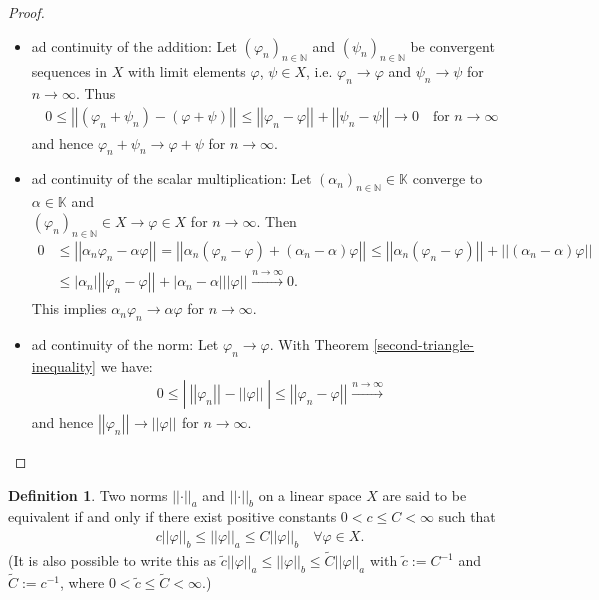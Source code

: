 \documentclass[12pt, a4paper]{article}
\numberwithin{equation}{section}
\theoremstyle{definition}
\theoremstyle{definition}
\newtheorem{defn}[thm]{Definition} %
\newcommand{\norm}[2]{\left\vert\left\vert #1 \right\vert\right\vert_{#2}}
\newcommand{\abs}[1]{\left\vert #1 \right\vert}
\begin{document}
	\begin{proof} 
		\begin{itemize}
			\item ad continuity of the addition: Let $(\varphi_n)_{n\in\mathbb{N}}$ and $(\psi_n)_{n\in\mathbb{N}}$ be convergent sequences in $X$ with limit elements $\varphi$, $\psi\in X$, i.e. $\varphi_n \longrightarrow \varphi$ and $\psi_n \longrightarrow \psi$ for $n\to\infty$. Thus 
			\begin{align}
				0\leq \norm{(\varphi_n + \psi_n) - (\varphi + \psi)}{} \leq \norm{\varphi_n - \varphi}{} + \norm{\psi_n - \psi}{} \longrightarrow 0 \quad\text{for } n\to \infty
			\end{align}
			and hence $\varphi_n + \psi_n \rightarrow \varphi + \psi$ for $n\to\infty$. 
			\item ad continuity of the scalar multiplication: Let $\left(\alpha_n\right)_{n\in\mathbb N} \in \mathbb K$ converge to $\alpha\in \mathbb K$ and \\ $\left(\varphi_n\right)_{n\in\mathbb N}\in X \rightarrow \varphi\in X$ for $n\to\infty$. Then 	
			\begin{align}
				0&\leq\norm{\alpha_n\varphi_n-\alpha\varphi}{} = \norm{\alpha_n\left(\varphi_n-\varphi\right) + \left(\alpha_n-\alpha\right)\varphi}{} \leq \norm{\alpha_n(\varphi_n-\varphi)}{} + \norm{\left(\alpha_n - \alpha\right)\varphi}{}
				\\ &\leq \abs{\alpha_n}\norm{\varphi_n-\varphi}{} + \abs{\alpha_n-\alpha}\norm{\varphi}{} \overset{n\to\infty}{\longrightarrow} 0. 
			\end{align}
			This implies $\alpha_n\varphi_n  \rightarrow \alpha\varphi$ for $n\to\infty$. 
			\item ad continuity of the norm: Let $\varphi_n \rightarrow\varphi$. With Theorem \ref{second-triangle-inequality} we have: 
			\begin{align}
				0\leq \abs{\ \norm{\varphi_n}{}-\norm{\varphi}{}\ } \leq \norm{\varphi_n - \varphi}{} \overset{n\to\infty}{\longrightarrow}  
			\end{align}
			and hence $\norm{\varphi_n}{} \rightarrow \norm{\varphi}{}$ for $n\to\infty$. 
		\end{itemize}
	\end{proof} 


	\begin{defn}
		Two norms $\left\vert\left\vert \cdot \right\vert\right\vert_{a}$ and $\left\vert\left\vert \cdot \right\vert\right\vert_{b}$ on a linear space $X$ are said to be equivalent if and only if there exist positive constants $0 < c \leq C < \infty$ such that 
		\begin{align}\label{equivalence_norms}
			c\norm{\varphi}{b} \leq \norm{\varphi}{a} \leq C\norm{\varphi}{b} \quad \forall \varphi \in X. 
		\end{align}	
		(It is also possible to write this as $\tilde{c}\norm{\varphi}{a} \leq \norm{\varphi}{b} \leq \tilde{C}\norm{\varphi}{a}$ with $\tilde{c} := C^{-1}$ and $\tilde{C} := c^{-1}$, where $0 < \tilde{c} \leq \tilde{C}<\infty$.)
	\end{defn}
\end{document}

